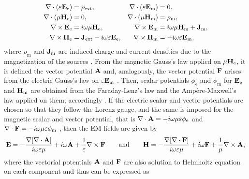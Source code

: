 \begin{subequations}
    \label{eq:MaxwellsEq-em}
\begin{align}
    \nabla \cdot \qty(\varepsilon \vb{E}_\text{e})  &= \rho_\text{ext},
                    &\nabla \cdot \qty(\varepsilon \vb{E}_\text{m})  &= 0,\\
    \nabla \cdot  (\mu\vb{H}_\text{e})  &= 0,
                    & \nabla \cdot  (\mu\vb{H}_\text{m})  &= \rho_\text{m},\\
    \nabla \times \vb{E}_\text{e}  &= i\omega \mu \vb{H}_\text{e},
                    & \nabla \times \vb{E}_\text{m}  &= i\omega \mu \vb{H}_\text{m} + \vb{J}_\text{m},\\
    \nabla \times \vb{H}_\text{e}  &= \vb{J}_\text{ext} - i\omega \varepsilon \vb{E}_\text{e},
                & \nabla \times \vb{H}_\text{m}  &=- i\omega \varepsilon \vb{E}_\text{m},
\end{align}
\end{subequations}%
%
%
%
%
where $\rho_\text{m}$ and $\vb{J}_\text{m}$ are  induced charge and current densities due to the magnetization of the sources \cite{jin_theory_2010}. From the magnetic Gauss's law applied on $\mu\vb{H}_\text{e}$, it is defined the vector potential $\vb{A}$ and, analogously, the vector potential $\vb{F}$ arises from the electric Gauss's law on $\varepsilon\vb{E}_\text{m}$ \cite{jin_theory_2010}. Then, scalar potentials $\phi_\text{e}$ and $\phi_\text{m}$ for $\vb{E}_\text{e} $ and $\vb{H}_\text{m}$ are obtained from the Faraday-Lenz's law and the Ampère-Maxwell's law applied on them, accordingly \cite{jin_theory_2010}. If the electric scalar and vector potentials are chosen so that they follow the Lorenz gauge, and the same is imposed for the magnetic scalar and vector potential, that is $\nabla\cdot\vb{A} = -i\omega\mu\varepsilon \phi_\text{e}$ and $\nabla\cdot\vb{F} = -i\omega\mu\varepsilon \phi_\text{m}$ \cite{zangwill_modern_2013}, then the EM fields are given by
%
\begin{align}
    \vb{E} = - \frac{\nabla[\nabla\cdot\vb{A}]}{i\omega\varepsilon\mu} + i \omega\vb{A} + \frac{1}{\varepsilon}\nabla\times\vb{F}
    \qquad
    \text{and}
    \qquad
    \vb{H} =- \frac{\nabla[\nabla\cdot\vb{F}]}{i\omega\varepsilon\mu} + i \omega\vb{F} + \frac{1}{\mu}\nabla\times\vb{A},
    \label{eq:EMFields}
\end{align}
%
where the vectorial potentials $\vb{A}$ and $\vb{F}$ are also solution to Helmholtz equation on each component and thus can be expressed as \cite{jin_theory_2010}
